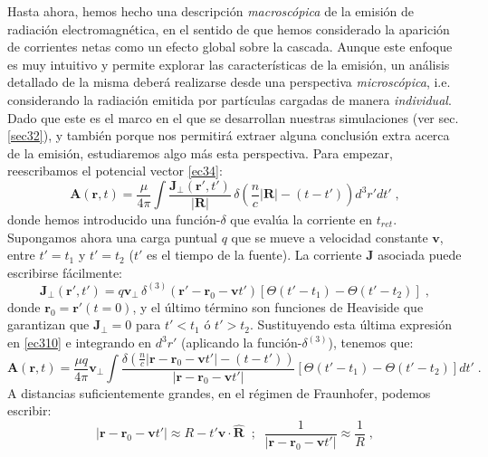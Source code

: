 \documentclass[11 pt, a4paper]{article} %
\numberwithin{equation}{section}
\numberwithin{figure}{section}
\numberwithin{table}{section}
\newcommand{\vect}[1]{\boldsymbol{\mathbf{#1}}}
\begin{document}
Hasta ahora, hemos hecho una descripción \textit{macroscópica} de la emisión de radiación electromagnética, en el sentido de que hemos considerado la aparición de corrientes netas como un efecto global sobre la cascada. Aunque este enfoque es muy intuitivo y permite explorar las características de la emisión, un análisis detallado de la misma deberá realizarse desde una perspectiva \textit{microscópica}, i.e. considerando la radiación emitida por partículas cargadas de manera \textit{individual}. Dado que este es el marco en el que se desarrollan nuestras simulaciones (ver sec. \ref{sec32}), y también porque nos permitirá extraer alguna conclusión extra acerca de la emisión, estudiaremos algo más esta perspectiva. Para empezar, reescribamos el potencial vector \eqref{ec34}:
\begin{equation}
	\vect{A}\left(\vect{r}, t\right)=\frac{\mu}{4\pi}\int \frac{\vect{J}_\perp\left(\vect{r}', t'\right)}{\left|\vect{R}\right|}\,\delta\left(\frac{n}{c}\left|\vect{R}\right|-\left(t-t'\right)\right)d^3r'dt'\;,\label{ec310}
\end{equation} 
donde hemos introducido una función-$\delta$ que evalúa la corriente en $t_{ret}$. Supongamos ahora una carga puntual $q$ que se mueve a velocidad constante $\vect{v}$, entre $t'=t_1$ y $t'=t_2$ ($t'$ es el tiempo de la fuente). La corriente $\vect{J}$ asociada puede escribirse fácilmente:
\begin{equation}
	\vect{J}_\perp\left(\vect{r'}, t'\right)=q\vect{v}_\perp \,\delta^{(3)}\left(\vect{r}'-\vect{r}_0-\vect{v}t'\right)\left[\Theta\left(t'-t_1\right)-\Theta\left(t'-t_2\right)\right]\;,\label{ec311}
\end{equation}
donde $\vect{r}_0=\vect{r}'\left(t=0\right)$, y el último término son funciones de Heaviside que garantizan que $\vect{J}_\perp=0$ para $t'<t_1$ ó $t'>t_2$. Sustituyendo esta última expresión en \eqref{ec310} e integrando en $d^3r'$ (aplicando la función-$\delta^{(3)}$), tenemos que:
\begin{equation}
	\vect{A}\left(\vect{r}, t\right)=\frac{\mu q}{4\pi}\vect{v}_\perp\int \frac{\delta\left(\frac{n}{c} \left|\vect{r}-\vect{r}_0-\vect{v}t'\right|-\left(t-t'\right)\right)}{\left|\vect{r}-\vect{r}_0-\vect{v}t'\right|}\left[\Theta\left(t'-t_1\right)-\Theta\left(t'-t_2\right)\right]dt'\;.\label{ec312}
\end{equation}
A distancias suficientemente grandes, en el régimen de Fraunhofer, podemos escribir:
\begin{equation}
	\left|\vect{r}-\vect{r}_0-\vect{v}t'\right|\approx R-t'\vect{v}\cdot\hat{\vect{R}}\;\;;\;\;\frac{1}{\left|\vect{r}-\vect{r}_0-\vect{v}t'\right|} \approx \frac{1}{R}\;,\label{ec313}
\end{equation}
\end{document}

